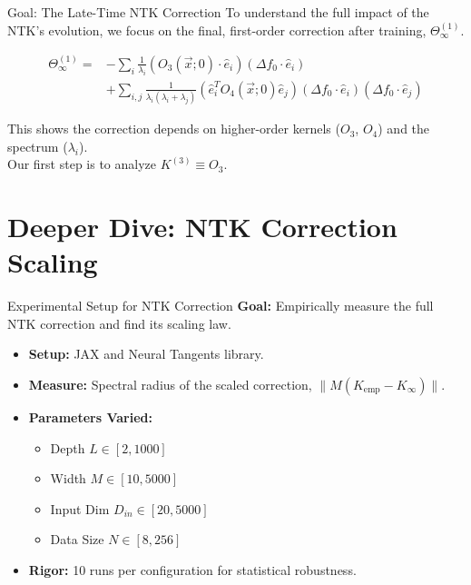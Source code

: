 \documentclass{beamer}
\begin{document}
\begin{frame}{Goal: The Late-Time NTK Correction}
To understand the full impact of the NTK's evolution, we focus on the final, first-order correction after training, $\Theta^{(1)}_\infty$.
\begin{theorem}
\begin{align*}
\Theta^{(1)}_\infty = & -\sum_{i}\frac{1}{\lambda_{i}}(O_{3}(\vec{x};0)\cdot\hat{e}_{i})(\Delta f_{0}\cdot\hat{e}_{i}) \\
& + \sum_{i,j}\frac{1}{\lambda_{i}(\lambda_{i}+\lambda_{j})}(\hat{e}_{i}^{T}O_{4}(\vec{x};0)\hat{e}_{j})(\Delta f_{0}\cdot \hat{e}_{i})(\Delta f_{0}\cdot \hat{e}_{j})
\end{align*}
\end{theorem}
\vspace{-0.5cm}
\begin{center}
\small
This shows the correction depends on higher-order kernels ($O_3$, $O_4$) and the spectrum ($\lambda_i$).\\ Our first step is to analyze $K^{(3)} \equiv O_3$.
\end{center}
\end{frame}

\section{Deeper Dive: NTK Correction Scaling}

\begin{frame}{Experimental Setup for NTK Correction}
\textbf{Goal:} Empirically measure the full NTK correction and find its scaling law.
\begin{itemize}
    \item \textbf{Setup:} JAX and Neural Tangents library.
    \item \textbf{Measure:} Spectral radius of the scaled correction, $\|M(K_{\text{emp}} - K_{\infty})\|$.
    \item \textbf{Parameters Varied:}
    \begin{itemize}
        \item Depth $L \in [2, 1000]$
        \item Width $M \in [10, 5000]$
        \item Input Dim $D_{in} \in [20, 5000]$
        \item Data Size $N \in [8, 256]$
    \end{itemize}
    \item \textbf{Rigor:} 10 runs per configuration for statistical robustness.
\end{itemize}
\end{frame}
\end{document}
